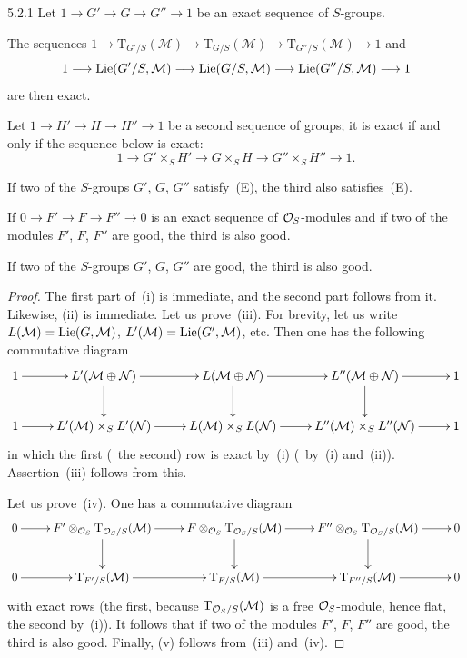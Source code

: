 \begin{lemma}{5.2.1}
\label{II.5.2.1}
{\renewcommand{\thefootnote}{(92)}}
Let \(1\to G'\to G\to G''\to 1\) be an exact sequence of \(S\)-groups.
\begin{enumeratei}
\item The sequences
\(1\to\mathrm{T}_{G'/S}(\mathcal{M})\to\mathrm{T}_{G/S}(\mathcal{M})
\to\mathrm{T}_{G''/S}(\mathcal{M})\to 1\)
and
\[
1\longrightarrow\operatorname{Lie}(G'/S,\mathcal{M})\longrightarrow\operatorname{Lie}(G/S,\mathcal{M})
\longrightarrow\operatorname{Lie}(G''/S,\mathcal{M})\longrightarrow 1
\]
are then exact.
\item Let \(1\to H'\to H\to H''\to 1\) be a second sequence of groups; it is
exact if and only if the sequence below is exact:
\[
1\to G'\times_S H'\to G\times_S H\to G''\times_S H''\to 1.
\]
\item If two of the \(S\)-groups \(G'\), \(G\), \(G''\) satisfy~(E), the third
also satisfies~(E).
\item If \(0\to F'\to F\to F''\to 0\) is an exact sequence of
\(\mathcal{O}_S\)-modules and if two of the modules \(F'\), \(F\), \(F''\) are good,
the third is also good.
\item If two of the \(S\)-groups \(G'\), \(G\), \(G''\) are good, the third
is also good.
\end{enumeratei}
\end{lemma}

\begin{proof}
\renewcommand{\qedsymbol}{}
{\renewcommand{\thefootnote}{(93)}}
The first part of~(i) is immediate, and the second part follows from it.
Likewise, (ii) is immediate. Let us prove~(iii). For brevity, let us write
\(L(\mathcal{M})=\operatorname{Lie}(G,\mathcal{M})\),
\(L'(\mathcal{M})=\operatorname{Lie}(G',\mathcal{M})\), etc. Then one has the following
commutative diagram
\[
\xymatrix{
1 \ar[r]
  & L'(\mathcal{M}\oplus\mathcal{N}) \ar[r] \ar[d]
  & L(\mathcal{M}\oplus\mathcal{N}) \ar[r] \ar[d]
  & L''(\mathcal{M}\oplus\mathcal{N}) \ar[r] \ar[d]
  & 1
\\
1 \ar[r]
  & L'(\mathcal{M})\times_S L'(\mathcal{N}) \ar[r]
  & L(\mathcal{M})\times_S L(\mathcal{N}) \ar[r]
  & L''(\mathcal{M})\times_S L''(\mathcal{N}) \ar[r]
  & 1
}
\]
in which the first (\resp\ the second) row is exact by~(i) (\resp\ by~(i)
and~(ii)). Assertion~(iii) follows from this.

Let us prove~(iv). One has a commutative diagram
\[
\xymatrix{
0 \ar[r]
  & F'\otimes_{\OS}\mathrm{T}_{\OS/S}(\mathcal{M}) \ar[r] \ar[d]
  & F\otimes_{\OS}\mathrm{T}_{\OS/S}(\mathcal{M}) \ar[r] \ar[d]
  & F''\otimes_{\OS}\mathrm{T}_{\OS/S}(\mathcal{M}) \ar[r] \ar[d]
  & 0
\\
0 \ar[r]
  & \mathrm{T}_{F'/S}(\mathcal{M}) \ar[r]
  & \mathrm{T}_{F/S}(\mathcal{M}) \ar[r]
  & \mathrm{T}_{F''/S}(\mathcal{M}) \ar[r]
  & 0
}
\]
with exact rows (the first, because \(\mathrm{T}_{\mathcal{O}_S/S}(\mathcal{M})\) is a
free \(\mathcal{O}_S\)-module, hence flat, the second by~(i)). It follows that if two
of the modules \(F'\), \(F\), \(F''\) are good, the third is also good.
Finally, (v) follows from~(iii) and~(iv).
\end{proof}

